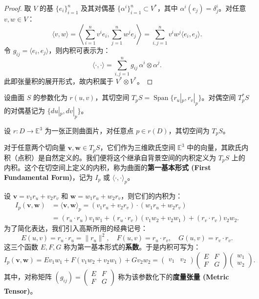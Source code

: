 \documentclass[lang=cn,10pt,thmcnt=section]{elegantbook}
\renewcommand{\vec}[1]{\mathbf{#1}}
\begin{document}
\begin{proof}
取 $V$ 的基 $\{e_i\}_{i=1}^n$ 及其对偶基 $\{\alpha^i\}_{i=1}^n \subset V^*$，其中 $\alpha^i(e_j) = \delta^i_j$。对任意 $v,w \in V$：
\[
\langle v, w \rangle = \left\langle \sum_{i=1}^n v^i e_i, \sum_{j=1}^n w^j e_j \right\rangle = \sum_{i,j=1}^n v^i w^j \langle e_i, e_j \rangle.
\]
令 $g_{ij} = \langle e_i, e_j \rangle$，则内积可表示为：
\[
\langle \cdot, \cdot \rangle = \sum_{i,j=1}^n g_{ij}\, \alpha^i \otimes \alpha^j.
\]
此即张量积的展开形式，故内积属于 $V^* \otimes V^*$。
\end{proof}
设曲面 $S$ 的参数化为 $r(u,v)$，其切空间 $T_pS = \operatorname{Span}\{r_u|_p, r_v|_p\}$。对偶空间 $T_p^*S$ 的对偶基记为 $\{du|_p, dv|_p\}$。
\begin{definition}[第一基本形式]
    设 $r: D \to \mathbb{E}^3$ 为一张正则曲面片，对任意点 $p \in r(D)$，其切空间为 $T_pS$。
    
    对于任意两个切向量 $\vec{v}, \vec{w} \in T_pS$，它们作为三维欧氏空间 $\mathbb{E}^3$ 中的向量，其欧氏内积（点积）是自然定义的。我们便将这个继承自背景空间的内积定义为 $T_pS$ 上的内积。这个在切空间上定义的内积，称为曲面的\textbf{第一基本形式 (First Fundamental Form)}，记为 $I_p$ 或 $\langle \cdot, \cdot \rangle_p$。
    
    设 $\vec{v} = v_1 r_u + v_2 r_v$ 和 $\vec{w} = w_1 r_u + w_2 r_v$，则它们的内积为：
    \begin{align*}
        I_p(\vec{v}, \vec{w}) &= \langle \vec{v}, \vec{w} \rangle_p = (v_1 r_u + v_2 r_v) \cdot (w_1 r_u + w_2 r_v) \\
        &= (r_u \cdot r_u) v_1 w_1 + (r_u \cdot r_v) (v_1 w_2 + v_2 w_1) + (r_v \cdot r_v) v_2 w_2.
    \end{align*}
    为了简化表达，我们引入高斯所用的经典记号：
    \[
    E(u,v) = r_u \cdot r_u = \|r_u\|^2, \quad F(u,v) = r_u \cdot r_v, \quad G(u,v) = r_v \cdot r_v.
    \]
    这三个函数 $E, F, G$ 称为第一基本形式的\textbf{系数}。于是内积可写为：
    \[
    I_p(\vec{v}, \vec{w}) = E v_1 w_1 + F(v_1 w_2 + v_2 w_1) + G v_2 w_2 = 
    \begin{pmatrix} v_1 & v_2 \end{pmatrix} 
    \begin{pmatrix} E & F \\ F & G \end{pmatrix} 
    \begin{pmatrix} w_1 \\ w_2 \end{pmatrix}.
    \]
    其中，对称矩阵 $(g_{ij}) = \begin{pmatrix} E & F \\ F & G \end{pmatrix}$ 称为该参数化下的\textbf{度量张量 (Metric Tensor)}。
\end{definition}
\end{document}
